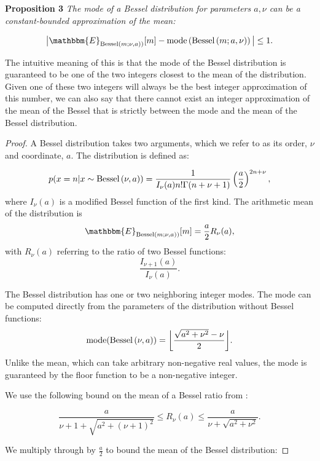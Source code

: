 \documentclass[letterpaper]{article}
\newcommand{\Bess}[1]{\textup{Bessel}\left( #1 \right)}
\newcommand{\besv}{order}
\newcommand{\besa}{coordinate}
\begin{document}
  \textbf{Proposition 3}
    \label{theorem:besselmode}
    \textit{The mode of a Bessel distribution for parameters $a, \nu$ can be a constant-bounded approximation of the mean:}
  
  \[
      \big| \mathbbm{E}_{\Bess{m; \nu, a})}[m]  - \textup{mode} \left(\Bess{m; a, \nu} \right) \big|  \leq 1.  
  \]
  
  The intuitive meaning of this is that the mode of the Bessel distribution is
  guaranteed to be one of the two integers closest to the mean of the
  distribution. Given one of these two integers will always be the best integer
  approximation of this number, we can also say that there cannot exist an
  integer approximation of the mean of the Bessel that is strictly between the
  mode and the mean of the Bessel distribution.
  
  \begin{proof}
  
  A Bessel distribution takes two arguments, which we refer to as its \besv,
  $\nu$ and \besa, $a$. The distribution is defined as:
  
  \[
      p(x = n | x \sim \Bess{\nu, a}) = \frac{1}{I_{\nu}(a)n!\Gamma(n + \nu + 1)} \left( \frac{a}{2} \right)^{2n + \nu},   
  \]
  where $I_{\nu}(a)$ is a modified Bessel function of the first kind. The
  arithmetic mean of the distribution is
  \[
      \mathbbm{E}_{\Bess{m; \nu, a})}[m] = \frac{a}{2} R_{\nu}(a),
  \]
  with $R_{\nu}(a)$ referring to the ratio of two Bessel functions:
  \[
      \frac{I_{\nu + 1}(a)}{I_{\nu}(a)}.
  \]
  
  The Bessel distribution has one or two neighboring integer modes. The mode can
  be computed directly from the parameters of the distribution without Bessel
  functions:
  \[
      \textup{mode}(\Bess{\nu, a}) = \bigg \lfloor \frac{\sqrt{a^2 + \nu^2} - \nu}{2} \bigg \rfloor.
  \]
  Unlike the mean, which can take arbitrary non-negative real values, the mode
  is guaranteed by the floor function to be a non-negative integer.
  
  We use the following bound on the mean of a Bessel ratio from
  \citet{devroye2002simulating}:
  
  \begin{equation}
      \frac{a}{\nu + 1 + \sqrt{a^2 + (\nu + 1)^2}} \leq R_{\nu}(a)
      \leq \frac{a}{\nu + \sqrt{a^2 + \nu^2}}.
  \end{equation}
  
  We multiply through by $\frac{a}{2}$ to bound the mean of the Bessel
  distribution:
  

\end{proof}
\end{document}
